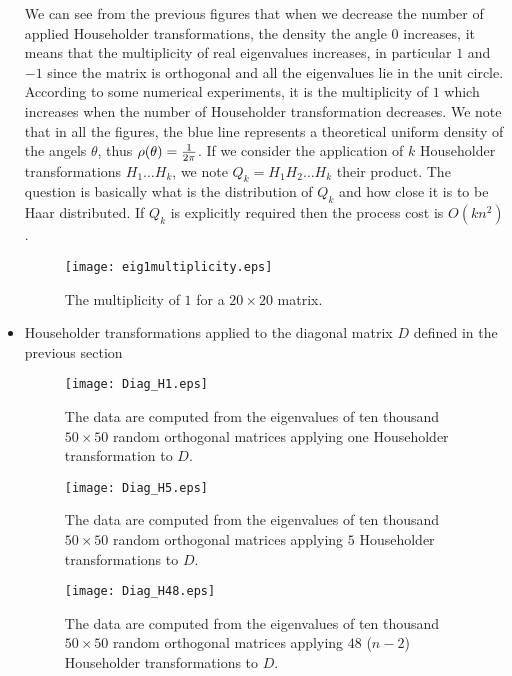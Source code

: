 \documentclass[a4paper]{article}
\begin{document}
\begin{itemize}
We can see from the previous figures that when we decrease the number of applied Householder 
transformations, the density the angle $0$ increases, it means that the multiplicity of real 
eigenvalues increases, in particular $1$ and $-1$ since the matrix is orthogonal and all the 
eigenvalues lie in the unit circle. According to some numerical experiments, it is the multiplicity 
of $1$ which increases when the number of Householder transformation decreases.
We note that in all the figures, the blue line represents a theoretical uniform density of the 
angels $\theta$, thus $\rho(\theta) =  {1 \over {2 \pi}}$. 
If we consider the application of $k$ Householder transformations $H_1 \ldots H_k$, we note 
$Q_k = H_1H_2 \ldots H_k$ their product. The question is basically what is the distribution 
of $Q_k$ and how close it is to be Haar distributed. If $Q_k$ is explicitly required then 
the process cost is $O(kn^2)$. 

\begin{figure}[!htb]
\centering
\texttt{[image: eig1multiplicity.eps]}
\caption{The multiplicity of $1$ for a $20 \times 20$ matrix.}
\label{fig:multiplicity}
\end{figure}


\item Householder transformations applied to the diagonal matrix $D$ defined in the previous section


\begin{figure}[!htb]
\texttt{[image: Diag\_H1.eps]}
\caption{The data are computed from the eigenvalues of ten thousand 
$50\times 50$ random orthogonal matrices applying one Householder transformation to $D$.}
\label{fig:qmult}
\end{figure}

\begin{figure}[!htb]
\texttt{[image: Diag\_H5.eps]}
\caption{The data are computed from the eigenvalues of ten thousand 
$50\times 50$ random orthogonal matrices applying $5$ Householder transformations to $D$.}
\label{fig:qmult}
\end{figure}

\begin{figure}[!htb]
\texttt{[image: Diag\_H48.eps]}
\caption{The data are computed from the eigenvalues of ten thousand 
$50\times 50$ random orthogonal matrices applying $48$ ($n-2$) Householder transformations to $D$.}
\label{fig:qmult}
\end{figure}

\end{itemize}
\end{document}
